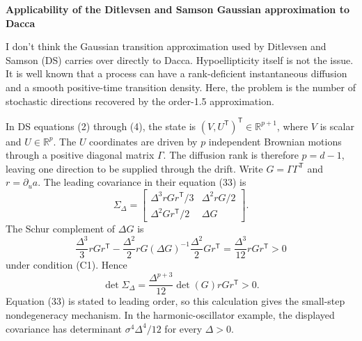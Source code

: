 \documentclass[10pt]{article}
\newcommand{\R}{\mathbb R}
\begin{document}
\begin{center}
{\Large\bf Applicability of the Ditlevsen and Samson Gaussian approximation to Dacca}
\end{center}

I don't think the Gaussian transition approximation used by Ditlevsen and Samson (DS) carries
over directly to Dacca.  Hypoellipticity itself is not the issue.  
It is well known that
a process can have a rank-deficient instantaneous diffusion and a smooth
positive-time transition density.  Here, the problem is the number of stochastic
directions recovered by the order-1.5 approximation.

In DS equations (2) through (4), the state is
$(V,U^\mathsf T)^\mathsf T\in\R^{p+1}$, where $V$ is scalar and
$U\in\R^p$.  The $U$ coordinates are driven by $p$ independent Brownian
motions through a positive diagonal matrix $\Gamma$.  The diffusion rank is
therefore $p=d-1$, leaving one direction to be supplied through the drift.
Write $G=\Gamma\Gamma^\mathsf T$ and $r=\partial_u a$.  The leading covariance
in their equation (33) is
\[
 \Sigma_\Delta=
 \begin{bmatrix}
  \Delta^3rGr^\mathsf T/3&\Delta^2rG/2\\
  \Delta^2Gr^\mathsf T/2&\Delta G
 \end{bmatrix}.
\]
The Schur complement of $\Delta G$ is
\[
 \frac{\Delta^3}{3}rGr^\mathsf T-
 \frac{\Delta^2}{2}rG(\Delta G)^{-1}
 \frac{\Delta^2}{2}Gr^\mathsf T
 =\frac{\Delta^3}{12}rGr^\mathsf T>0
\]
under condition (C1).  Hence
\[
 \det\Sigma_\Delta=\frac{\Delta^{p+3}}{12}
 \det(G)rGr^\mathsf T>0.
\]
Equation (33) is stated to leading order, so this calculation gives the
small-step nondegeneracy mechanism.  In the harmonic-oscillator example, the
displayed covariance has determinant $\sigma^4\Delta^4/12$ for every
$\Delta>0$.
\end{document}
